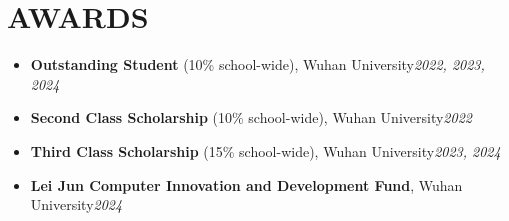 \documentclass{resume}
\begin{document}



\section{AWARDS}
\begin{itemize}[parsep=0.5ex]
  \item \textbf{Outstanding Student} (10\% school-wide), Wuhan University{\hfill{\textit{2022, 2023, 2024}}}
  \item \textbf{Second Class Scholarship} (10\% school-wide), Wuhan University{\hfill{\textit{2022}}}
  \item \textbf{Third Class Scholarship} (15\% school-wide), Wuhan University{\hfill{\textit{2023, 2024}}}
  \item \textbf{Lei Jun Computer Innovation and Development Fund}, Wuhan University{\hfill{\textit{2024}}}
\end{itemize}
\end{document}
